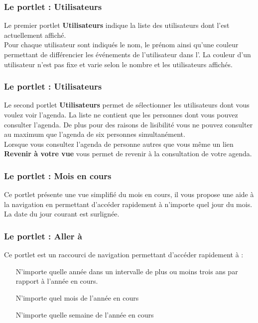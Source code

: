 \subsubsection{Le portlet : Utilisateurs}

Le premier portlet \textbf{Utilisateurs} indique la liste des utilisateurs dont
l'\agenda est actuellement affiché.\\
Pour chaque utilisateur sont indiqués le nom, le prénom ainsi qu'une couleur permettant de différencier les événements de l'utilisateur dans l'\agenda. La couleur d'un utilisateur n'est pas fixe et varie selon le nombre et les utilisateurs affichés.

\subsubsection{Le portlet : Utilisateurs}

Le second portlet \textbf{Utilisateurs} permet de sélectionner les utilisateurs
dont vous voulez voir l'agenda. La liste ne contient que les personnes dont vous
pouvez consulter l'agenda. De plus pour des raisons de lisibilité vous ne pouvez
consulter au maximum que l'agenda de six personnes simultanément.\\
Lorsque vous consultez l'agenda de personne autres que vous même un lien
\textbf{Revenir à votre vue} vous permet de revenir à la consultation de votre
agenda.

\subsubsection{Le portlet : Mois en cours}

Ce portlet présente une vue simplifié du mois en cours, il vous propose une aide à la navigation en permettant d'accéder rapidement à n'importe quel jour du mois. La
date du jour courant est surlignée.

\subsubsection{Le portlet : Aller à}

Ce portlet est un raccourci de navigation permettant d'accéder rapidement à :
\begin{itemize}
\item[N'importe quelle année dans un intervalle de plus ou moins trois ans par
rapport à l'année en cours.]
\item[N'importe quel mois de l'année en cours]
\item[N'importe quelle semaine de l'année en cours]
\end{itemize}
